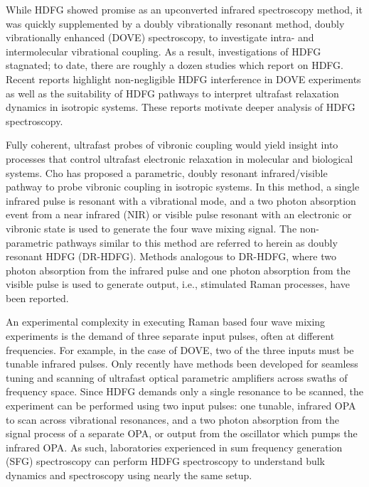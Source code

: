 \documentclass[aip, jcp, reprint, onecolumn]{revtex4-2}
\begin{document}
While HDFG showed promise as an upconverted infrared spectroscopy method, it was quickly supplemented by a doubly vibrationally resonant method, doubly vibrationally enhanced (DOVE) spectroscopy, to investigate intra- and intermolecular vibrational coupling. \cite{RN345, RN101, Cho2000}
As a result, investigations of HDFG stagnated; to date, there are roughly a dozen studies which report on HDFG. \cite{Zilian1994, RN350, RN416, RN351, RN352, RN353, Chen1998, RN362, RN418, Bonn2024, McDonnell2024}
Recent reports highlight non-negligible HDFG interference in DOVE experiments as well as the suitability of HDFG pathways to interpret ultrafast relaxation dynamics in isotropic systems. \cite{Bonn2024, McDonnell2024}
These reports motivate deeper analysis of HDFG spectroscopy. 

Fully coherent, ultrafast probes of vibronic coupling would yield insight into processes that control ultrafast electronic relaxation in molecular and biological systems. \cite{Bredenbeck2015, Arsenault2021}
Cho has proposed a parametric, doubly resonant infrared/visible pathway to probe vibronic coupling in isotropic systems. \cite{Cho2001}
In this method, a single infrared pulse is resonant with a vibrational mode, and a two photon absorption event from a near infrared (NIR) or visible pulse resonant with an electronic or vibronic state is used to generate the four wave mixing signal.
The non-parametric pathways similar to this method are referred to herein as doubly resonant HDFG (DR-HDFG).
Methods analogous to DR-HDFG, where two photon absorption from the infrared pulse and one photon absorption from the visible pulse is used to generate output, i.e., stimulated Raman processes, have been reported. \cite{RN301, RN120} 

An experimental complexity in executing Raman based four wave mixing experiments is the demand of three separate input pulses, often at different frequencies.
For example, in the case of DOVE, two of the three inputs must be tunable infrared pulses. \cite{RN345} 
Only recently have methods been developed for seamless tuning and scanning of ultrafast optical parametric amplifiers across swaths of frequency space. \cite{RN162, McDonnell2024}
Since HDFG demands only a single resonance to be scanned, the experiment can be performed using two input pulses: one tunable, infrared OPA to scan across vibrational resonances, and a two photon absorption from the signal process of a separate OPA, or output from the oscillator which pumps the infrared OPA. \cite{Wang2021}
As such, laboratories experienced in sum frequency generation (SFG) spectroscopy can perform HDFG spectroscopy to understand bulk dynamics and spectroscopy using nearly the same setup.
\end{document}
